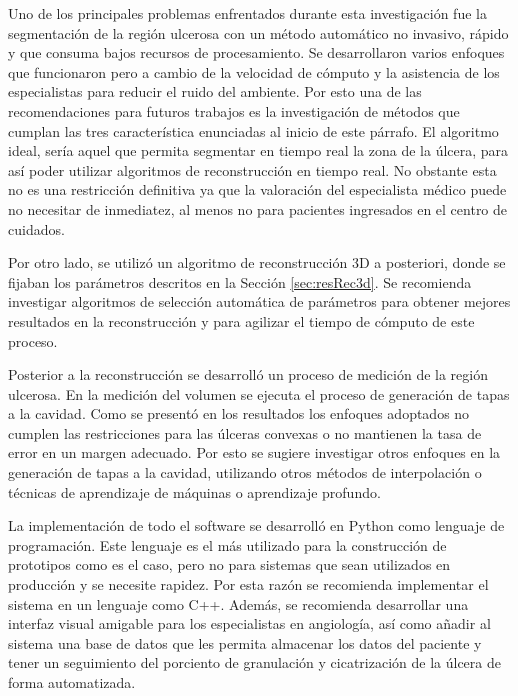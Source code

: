\begin{recomendations}
	
Uno de los principales problemas enfrentados durante esta investigación fue la segmentación de la región ulcerosa con un método automático no invasivo, rápido y que consuma bajos recursos de procesamiento. Se desarrollaron varios enfoques que funcionaron pero a cambio de la velocidad de cómputo y la asistencia de los especialistas para reducir el ruido del ambiente. Por esto una de las recomendaciones para futuros trabajos es la investigación de métodos que cumplan las tres característica enunciadas al inicio de este párrafo. El algoritmo ideal, sería aquel que permita segmentar en tiempo real la zona de la úlcera, para así poder utilizar algoritmos de reconstrucción en tiempo real. No obstante esta no es una restricción definitiva ya que la valoración del especialista médico puede no necesitar de inmediatez, al menos no para pacientes ingresados en el centro de cuidados. 

Por otro lado, se utilizó un algoritmo de reconstrucción 3D a posteriori, donde se fijaban los parámetros descritos en la Sección \ref{sec:resRec3d}. Se recomienda investigar algoritmos de selección automática de parámetros para obtener mejores resultados en la reconstrucción y para agilizar el tiempo de cómputo de este proceso.

Posterior a la reconstrucción se desarrolló un proceso de medición de la región ulcerosa. En la medición del volumen se ejecuta el proceso de generación de tapas a la cavidad. Como se presentó en los resultados los enfoques adoptados no cumplen las restricciones para las úlceras convexas o no mantienen la tasa de error en un margen adecuado. Por esto se sugiere investigar otros enfoques en la generación de tapas a la cavidad, utilizando otros métodos de interpolación o técnicas de aprendizaje de máquinas o aprendizaje profundo.

La implementación de todo el software se desarrolló en Python como lenguaje de programación. Este lenguaje es el más utilizado para la construcción de prototipos como es el caso, pero no para sistemas que sean utilizados en producción y se necesite rapidez. Por esta razón se recomienda implementar el sistema en un lenguaje como C++. Además, se recomienda desarrollar una interfaz visual amigable para los especialistas en angiología, así como añadir al sistema una base de datos que les permita almacenar los datos del paciente y tener un seguimiento del porciento de granulación y cicatrización de la úlcera de forma automatizada.
\end{recomendations}
